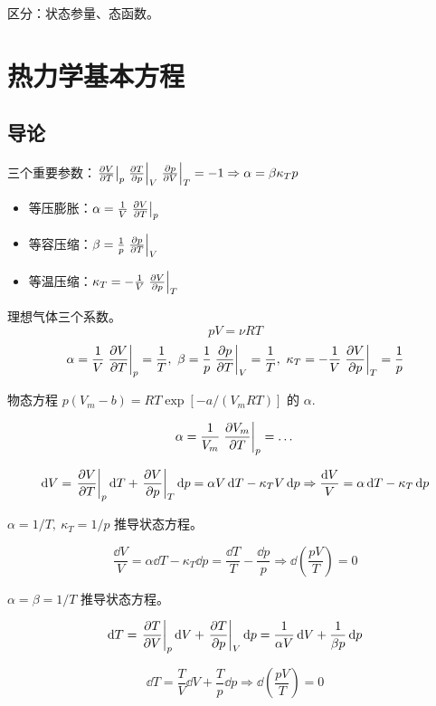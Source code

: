 区分：状态参量、态函数。

\section{热力学基本方程}

\subsection{导论}

三个重要参数：$\left.\pdv{V}{T}\right|_p \left.\pdv{T}{p}\right|_V \left.\pdv{p}{V}\right|_T = - 1 \Rightarrow \alpha = \beta \kappa_T p$

\begin{itemize}
    \item 等压膨胀：$\alpha = \frac{1}{V} \left.\pdv{V}{T}\right|_p$
    \item 等容压缩：$\beta = \frac{1}{p} \left.\pdv{p}{T}\right|_V$
    \item 等温压缩：$\kappa_T = - \frac{1}{V} \left.\pdv{V}{p}\right|_T$
\end{itemize}

\begin{framed}
    理想气体三个系数。
    \[
        p V = \nu R T
    \]
    \[
        \alpha = \frac{1}{V} \left.\pdv{V}{T}\right|_p = \frac{1}{T},\ \beta = \frac{1}{p} \left.\pdv{p}{T}\right|_V = \frac{1}{T},\ \kappa_T = - \frac{1}{V} \left.\pdv{V}{p}\right|_T = \frac{1}{p}
    \]
\end{framed}

\begin{framed}
    物态方程 $p (V_m - b) = R T \exp [-a / (V_m R T)]$ 的 $\alpha$.

    \[
        \alpha = \frac{1}{V_m} \left.\pdv{V_m}{T}\right|_p = \dots
    \]
\end{framed}

\[
    \dd V = \left.\pdv{V}{T}\right|_p \dd{T} + \left.\pdv{V}{p}\right|_T \dd{p} = \alpha V \dd{T} - \kappa_T V \dd{p} \Rightarrow \frac{\dd{V}}{V} = \alpha \dd{T} - \kappa_T \dd{p}
\]

\begin{framed}
    $\alpha = 1 / T,\ \kappa_T = 1 / p$ 推导状态方程。

    \[
        \frac{\dd{V}}{V} = \alpha \dd{T} - \kappa_T \dd{p} = \frac{\dd{T}}{T} - \frac{\dd{p}}{p} \Rightarrow \dd{(\frac{p V}{T})} = 0
    \]
\end{framed}

\begin{framed}
    $\alpha = \beta = 1 / T$ 推导状态方程。

    \[
        \dd T = \left.\pdv{T}{V}\right|_p \dd{V} + \left.\pdv{T}{p}\right|_V \dd{p} = \frac{1}{\alpha V} \dd{V} + \frac{1}{\beta p} \dd{p}
    \]

    \[
        \dd T = \frac{T}{V} \dd{V} + \frac{T}{p} \dd{p} \Rightarrow \dd{(\frac{p V}{T})} = 0
    \]
\end{framed}

